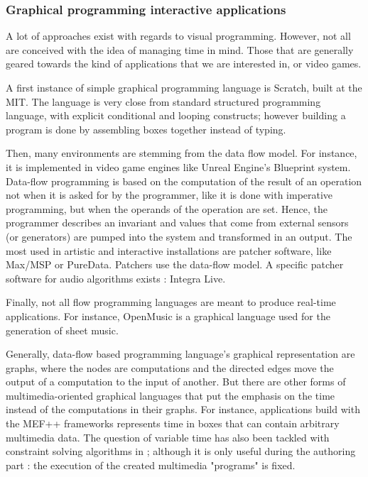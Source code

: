 \documentclass{sigchi}
\begin{document}
\subsubsection{Graphical programming interactive applications}
A lot of approaches exist with regards to visual programming. However, not all are conceived with the idea of managing time in mind. Those that are generally geared towards the kind of applications that we are interested in, or video games.

A first instance of simple graphical programming language is Scratch\cite{resnick2009scratch}, built at the MIT. The language is very close from standard structured programming language, with explicit conditional and looping constructs; however building a program is done by assembling boxes together instead of typing.

Then, many environments are stemming from the data flow model. For instance, it is implemented in video game engines like Unreal Engine's Blueprint system\cite{shah2014mastering}. Data-flow programming is based on the computation of the result of an operation not when it is asked for by the programmer, like it is done with imperative programming, but when the operands of the operation are set. Hence, the programmer describes an invariant and values that come from external sensors (or generators) are pumped into the system and transformed in an output.
The most used in artistic and interactive installations are patcher software, like Max/MSP or PureData. Patchers use the data-flow model. A specific patcher software for audio algorithms exists : Integra Live\cite{bullock2011integra}.

Finally, not all flow programming languages are meant to produce real-time applications. For instance, OpenMusic\cite{bresson_openmusic:_2011} is a graphical language used for the generation of sheet music.

Generally, data-flow based programming language's graphical representation are graphs, where the nodes are computations and the directed edges move the output of a computation to the input of another.
But there are other forms of multimedia-oriented graphical languages that put the emphasis on the time instead of the computations in their graphs. For instance, applications build with the MEF++ frameworks\cite{ackermann_direct_1994} represents time in boxes that can contain arbitrary multimedia data. The question of variable time has also been tackled with constraint solving algorithms in \cite{song_interactive_1999}; although it is only useful during the authoring part : the execution of the created multimedia "programs" is fixed.
\end{document}
